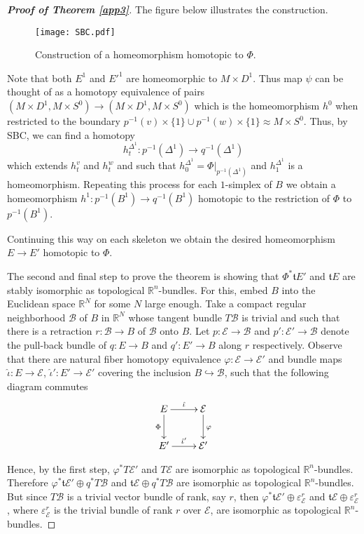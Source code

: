 \documentclass[onecolumn,notitlepage,11pt]{article}
\newcommand{\R}{\mathbb{R}}
\newcommand{\beq}{\begin{equation*}}
\newcommand{\eeq}{\end{equation*}}
\theoremstyle{definition}
\begin{document}
\begin{proof}[\textbf{Proof of Theorem \ref{app3}}]
The figure below illustrates the construction.

\begin{figure}[!h]
\vspace*{0cm}
    \begin{center}
    \texttt{[image: SBC.pdf]}
    \caption{\small Construction of a homeomorphism homotopic
    to $\Phi$.}
    \end{center}
 \end{figure}
 
Note that both $E^1$ and $E'^1$ are homeomorphic to $M\times D^1$. Thus
map $\psi$ can be thought of as a homotopy equivalence of pairs
$(M\times D^1,M\times S^0)\to (M\times D^1,M\times S^0)$ which is
the homeomorphism 
$h^{0}$ when restricted to the
boundary 
$p^{-1}(v)\times\{1\}\cup p^{-1}(w)\times\{1\}\approx M\times S^{0}$. Thus, by SBC,  we can find a homotopy
\beq
h^{\Delta^1}_t:p^{-1}(\Delta^1)\to q^{-1}(\Delta^1)
\eeq
which extends $h_t^v$ and $h_t^w$ and such that $h^{\Delta^1}_0=\Phi|_{p^{-1}(\Delta^1)}$ and $h^{\Delta^1}_1$ 
is a homeomorphism. Repeating this process for each $1$-simplex of $B$ we obtain a
homeomorphism
$h^1:p^{-1}(B^1)\to q^{-1}(B^1)$ homotopic to the 
restriction of $\Phi$ to $p^{-1}(B^1)$. 

Continuing this way on each skeleton we obtain the
desired homeomorphism $E\to E'$ homotopic to $\Phi$.
 
The second and final step to prove the theorem is showing that
$\Phi^*\mathfrak{t}E'$ and $\mathfrak{t}E$ are stably isomorphic as
topological $\R^n$-bundles. For this, embed $B$ into the Euclidean
space $\R^N$ for some $N$ large enough. 
Take a compact regular neighborhood $\mathcal{B}$ 
of $B$ in $\R^N$ whose tangent bundle $T\mathcal{B}$ is trivial and such that there is a retraction $r:\mathcal{B}\to B$ of
$\mathcal{B}$ onto $B$.
Let $p:\mathcal{E}\to\mathcal{B}$ and
$p':\mathcal{E'}\to\mathcal{B}$
denote the pull-back bundle of $q:E\to B$  and $q':E'\to B$ along $r$
respectively. Observe that there are natural fiber homotopy equivalence
$\varphi:\mathcal{E}\to\mathcal{E'}$ and bundle maps 
$\hat{\iota}:E\to\mathcal{E}$, $\hat{\iota}':E'\to\mathcal{E}'$ covering
the inclusion $B\hookrightarrow\mathcal{B}$, such that the following 
diagram commutes
\beq
\xymatrix{
E\ar[r]^-{\hat{\iota}}\ar[d]_-{\Phi} & \mathcal{E}\ar[d]^{\varphi}\\
E'\ar[r]^-{\hat{\iota}'}			  & \mathcal{E}'
}
\eeq

Hence, by the first step,
$\varphi^*T\mathcal{E'}$ and $T\mathcal{E}$ are isomorphic as topological
$\R^n$-bundles. Therefore 
$\varphi^*\mathfrak{t}\mathcal{E'}\oplus q^*T\mathcal{B}$ and
$\mathfrak{t}\mathcal{E}\oplus q^*T\mathcal{B}$ are isomorphic as
topological $\R^n$-bundles. But since $T\mathcal{B}$ is a trivial vector bundle of rank, say $r$, then $\varphi^*\mathfrak{t}\mathcal{E'}\oplus\varepsilon_{\mathcal{E}}^r$ and
$\mathfrak{t}\mathcal{E}\oplus\varepsilon_{\mathcal{E}}^r$, where
$\varepsilon_{\mathcal{E}}^r$ is the trivial
bundle of rank $r$ over $\mathcal{E}$, are isomorphic as topological 
$\R^n$-bundles.


\end{proof}
\end{document}
